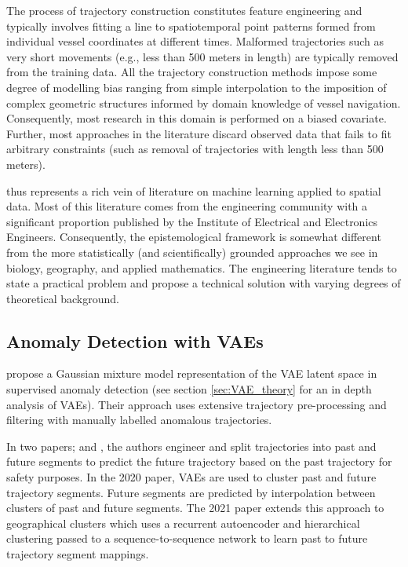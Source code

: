 \documentclass{mldsmsc}
\begin{document}
The process of trajectory construction constitutes feature engineering and typically involves fitting a line to spatiotemporal point patterns formed from individual vessel coordinates at different times. Malformed trajectories such as very short movements (e.g., less than  500 meters in length) are typically removed from the training data. All the trajectory construction methods impose some degree of modelling bias ranging from simple interpolation to the imposition of complex geometric structures informed by domain knowledge of vessel navigation. Consequently, most research in this domain is performed on a biased covariate. Further, most approaches in the literature discard observed data that fails to fit arbitrary constraints (such as removal of trajectories with length less than 500 meters). 

\cite{wolsing_anomaly_2022} thus represents a rich vein of literature on machine learning applied to spatial data. Most of this literature comes from the engineering community with a significant proportion published by the Institute of Electrical and Electronics Engineers. Consequently, the epistemological framework is somewhat different from the more statistically (and scientifically) grounded approaches we see in biology, geography, and applied mathematics. The engineering literature tends to state a practical problem and propose a technical solution with varying degrees of theoretical background.

\subsection{Anomaly Detection with VAEs}\label{sec:anomaly_detection_with_VAES}
\cite{xie_novel_2023} propose a Gaussian mixture model representation of the VAE latent space in supervised anomaly detection (see section \ref{sec:VAE_theory} for an in depth analysis of VAEs). Their approach uses extensive trajectory pre-processing and filtering with manually labelled anomalous trajectories.

In two papers; \cite{murray_dual_2020} and \cite{murray_ais-based_2021}, the authors engineer and split trajectories into past and future segments to predict the future trajectory based on the past trajectory for safety purposes. In the 2020 paper, VAEs are used to cluster past and future trajectory segments. Future segments are predicted by interpolation between clusters of past and future segments. The 2021 paper extends this approach to geographical clusters which uses a recurrent autoencoder and hierarchical clustering passed to a sequence-to-sequence network to learn past to future trajectory segment mappings.
\end{document}
